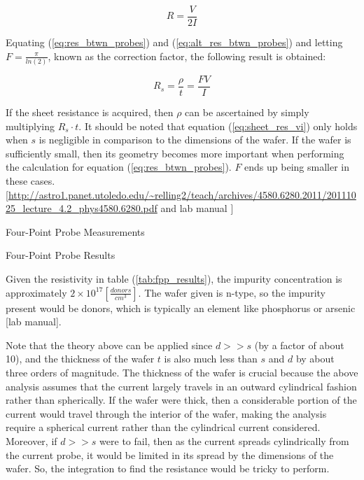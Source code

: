 \documentclass{article}
\begin{document}
\begin{equation}
\label{eq:alt_res_btwn_probes}
R = \frac{V}{2I}
\end{equation}

Equating (\ref{eq:res_btwn_probes}) and (\ref{eq:alt_res_btwn_probes}) and letting $F = \frac{\pi}{ln(2)}$, known as the correction factor, the following result is obtained:

\begin{equation}
\label{eq:sheet_res_vi}
R_s = \frac{\rho}{t} = \frac{ FV }{ I }
\end{equation}

If the sheet resistance is acquired, then $\rho$ can be ascertained by simply multiplying $R_s \cdot t$. It should be noted that equation (\ref{eq:sheet_res_vi}) only holds when $s$ is negligible in comparison to the dimensions of the wafer. If the wafer is sufficiently small, then its geometry becomes more important when performing the calculation for equation (\ref{eq:res_btwn_probes}). $F$ ends up being smaller in these cases. [\url{http://astro1.panet.utoledo.edu/~relling2/teach/archives/4580.6280.2011/20111025_lecture_4.2_phys4580.6280.pdf} and lab manual ] %


\FloatBarrier

\begin{table}[h!]
	\centering
	\caption{Four-Point Probe Measurements}
	\label{tab:fpp_measure}
\end{table}

\FloatBarrier

\begin{table}[h!]
	\centering
	\caption{Four-Point Probe Results}
	\label{tab:fpp_results}
\end{table}

\FloatBarrier

Given the resistivity in table (\ref{tab:fpp_results}), the impurity concentration is approximately $2 \times 10^{17} [\frac{donors}{cm^3}]$. The wafer given is n-type, so the impurity present would be donors, which is typically an element like phosphorus or arsenic [lab manual].

Note that the theory above can be applied since $d >> s$ (by a factor of about 10), and the thickness of the wafer $t$ is also much less than $s$ and $d$ by about three orders of magnitude. The thickness of the wafer is crucial because the above analysis assumes that the current largely travels in an outward cylindrical fashion rather than spherically. If the wafer were thick, then a considerable portion of the current would travel through the interior of the wafer, making the analysis require a spherical current rather than the cylindrical current considered. Moreover, if $d >> s$ were to fail, then as the current spreads cylindrically from the current probe, it would be limited in its spread by the dimensions of the wafer. So, the integration to find the resistance would be tricky to perform.%
\end{document}

